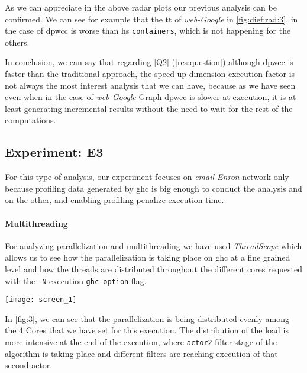   As we can appreciate in the above radar plots our previous analysis can be confirmed. We can see for example that the \acrlong{tt} of \emph{web-Google} in \autoref{fig:dief:rad:3}, in the case of \acrshort{dpwcc} is worse than \acrshort{hs} \texttt{containers}, which is not happening for the others.
  
  In conclusion, we can say that regarding [Q2] (\autoref{res:question}) although \acrshort{dpwcc} is faster than the traditional approach, the speed-up dimension execution factor is not always the most interest analysis that we can have, because as we have seen even when in the case of \emph{web-Google} Graph \acrshort{dpwcc} is slower at execution, it is at least generating incremental results without the need to wait for the rest of the computations.
  
  \subsection{Experiment: E3}
  For this type of analysis, our experiment focuses on \emph{email-Enron} network \cite{netenron} only because profiling data generated by \acrshort{ghc} is big enough to conduct the analysis and on the other, and enabling profiling penalize execution time.
  
  \paragraph{Multithreading} For analyzing parallelization and multithreading we have used \textit{ThreadScope} \cite{threadscope} which allows us to see how the parallelization is taking place on \acrshort{ghc} at a fine grained level and how the threads are distributed throughout the different cores requested with the \texttt{-N} execution \texttt{ghc-option} flag.
  
  \begin{minipage}[t!]{\linewidth}
  
    \texttt{[image: screen\_1]}
    \captionsetup{type=figure}
    \label{fig:3}
  \end{minipage}
  
  In \autoref{fig:3}, we can see that the parallelization is being distributed evenly among the $4$ Cores that we have set for this execution.
  The distribution of the load is more intensive at the end of the execution, where \texttt{actor2} filter stage 
  of the algorithm is taking place and different filters are reaching execution of that second actor.
  

